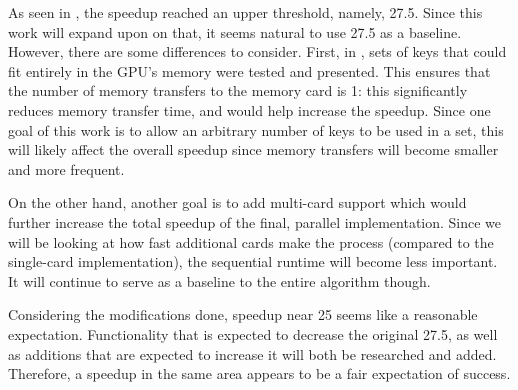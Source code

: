 \documentclass[12pt]{ucthesis}
\begin{document}
As seen in \cite{scharfglass2012CUDA}, the speedup reached an upper threshold,
namely, 27.5. Since this work will expand upon on that, it seems natural to use
27.5 as a baseline. However, there are some differences to consider. First,
in \cite{scharfglass2012CUDA}, sets of keys that could fit entirely in the
GPU's memory were tested and presented. This ensures that the number of memory
transfers to the memory card is 1: this significantly reduces memory transfer
time, and would help increase the speedup. Since one goal of this work is to
allow an arbitrary number of keys to be used in a set, this will likely affect
the overall speedup since memory transfers will become smaller and more
frequent.

On the other hand, another goal is to add multi-card support which would
further increase the total speedup of the final, parallel implementation. Since
we will be looking at how fast additional cards make the process (compared to
the single-card implementation), the sequential runtime will become less
important. It will continue to serve as a baseline to the entire algorithm
though. 

Considering the modifications done, speedup near 25 seems like a reasonable
expectation. Functionality that is expected to decrease the original 27.5, as
well as additions that are expected to increase it will both be researched and
added. Therefore, a speedup in the same area appears to be a fair expectation
of success.


\clearpage


\end{document}
